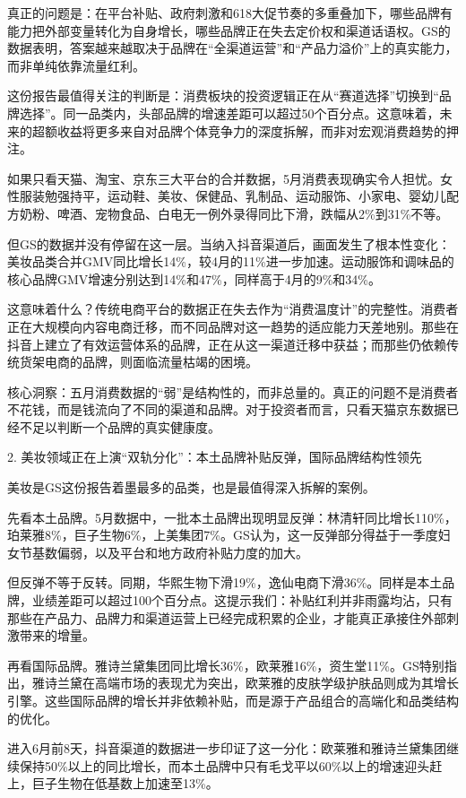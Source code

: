 \documentclass[11pt]{ctexart}
\begin{document}
真正的问题是：在平台补贴、政府刺激和618大促节奏的多重叠加下，哪些品牌有能力把外部变量转化为自身增长，哪些品牌正在失去定价权和渠道话语权。GS的数据表明，答案越来越取决于品牌在“全渠道运营”和“产品力溢价”上的真实能力，而非单纯依靠流量红利。

这份报告最值得关注的判断是：消费板块的投资逻辑正在从“赛道选择”切换到“品牌选择”。同一品类内，头部品牌的增速差距可以超过50个百分点。这意味着，未来的超额收益将更多来自对品牌个体竞争力的深度拆解，而非对宏观消费趋势的押注。

如果只看天猫、淘宝、京东三大平台的合并数据，5月消费表现确实令人担忧。女性服装勉强持平，运动鞋、美妆、保健品、乳制品、运动服饰、小家电、婴幼儿配方奶粉、啤酒、宠物食品、白电无一例外录得同比下滑，跌幅从2\%到31\%不等。

但GS的数据并没有停留在这一层。当纳入抖音渠道后，画面发生了根本性变化：美妆品类合并GMV同比增长14\%，较4月的11\%进一步加速。运动服饰和调味品的核心品牌GMV增速分别达到14\%和47\%，同样高于4月的9\%和34\%。

这意味着什么？传统电商平台的数据正在失去作为“消费温度计”的完整性。消费者正在大规模向内容电商迁移，而不同品牌对这一趋势的适应能力天差地别。那些在抖音上建立了有效运营体系的品牌，正在从这一渠道迁移中获益；而那些仍依赖传统货架电商的品牌，则面临流量枯竭的困境。

核心洞察：五月消费数据的“弱”是结构性的，而非总量的。真正的问题不是消费者不花钱，而是钱流向了不同的渠道和品牌。对于投资者而言，只看天猫京东数据已经不足以判断一个品牌的真实健康度。

2. 美妆领域正在上演“双轨分化”：本土品牌补贴反弹，国际品牌结构性领先

美妆是GS这份报告着墨最多的品类，也是最值得深入拆解的案例。

先看本土品牌。5月数据中，一批本土品牌出现明显反弹：林清轩同比增长110\%，珀莱雅8\%，巨子生物6\%，上美集团7\%。GS认为，这一反弹部分得益于一季度妇女节基数偏弱，以及平台和地方政府补贴力度的加大。

但反弹不等于反转。同期，华熙生物下滑19\%，逸仙电商下滑36\%。同样是本土品牌，业绩差距可以超过100个百分点。这提示我们：补贴红利并非雨露均沾，只有那些在产品力、品牌力和渠道运营上已经完成积累的企业，才能真正承接住外部刺激带来的增量。

再看国际品牌。雅诗兰黛集团同比增长36\%，欧莱雅16\%，资生堂11\%。GS特别指出，雅诗兰黛在高端市场的表现尤为突出，欧莱雅的皮肤学级护肤品则成为其增长引擎。这些国际品牌的增长并非依赖补贴，而是源于产品组合的高端化和品类结构的优化。

进入6月前8天，抖音渠道的数据进一步印证了这一分化：欧莱雅和雅诗兰黛集团继续保持50\%以上的同比增长，而本土品牌中只有毛戈平以60\%以上的增速迎头赶上，巨子生物在低基数上加速至13\%。
\end{document}
